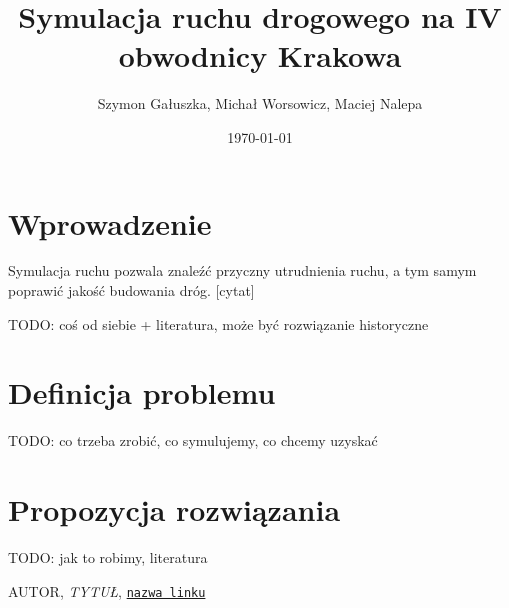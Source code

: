 \documentclass[a4paper,12pt]{article}
\title{Symulacja ruchu drogowego na IV obwodnicy Krakowa}
\author{Szymon Gałuszka, Michał Worsowicz, Maciej Nalepa}
\date{\today}
\begin{document}
	\maketitle
	
	\section{Wprowadzenie}
	Symulacja ruchu pozwala znaleźć przyczny utrudnienia ruchu, a tym samym poprawić jakość budowania dróg. [cytat]
	
	TODO: coś od siebie + literatura, może być rozwiązanie historyczne
	
	\section{Definicja problemu}
	TODO: co trzeba zrobić, co symulujemy, co chcemy uzyskać
	
	\section{Propozycja rozwiązania}
	TODO: jak to robimy, literatura
	
	\pagebreak
	\begin{thebibliography}{15}
		
		AUTOR, \textit{TYTUŁ},
		\texttt{\href{LINK}{nazwa linku}}
		
	\end{thebibliography}
	
\end{document}
